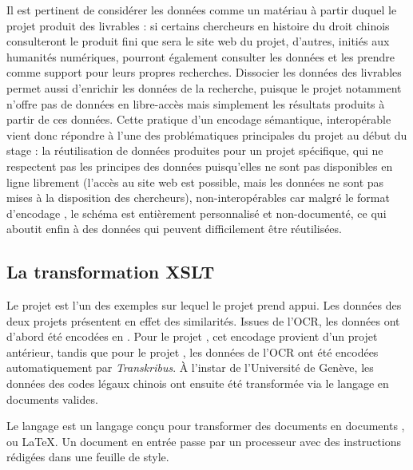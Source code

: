 Il est pertinent de considérer les données comme un matériau à partir duquel le projet produit des livrables : si certains chercheurs en histoire du droit chinois consulteront le produit fini que sera le site web du projet, d'autres, initiés aux humanités numériques, pourront également consulter les données \TEI et les prendre comme support pour leurs propres recherches. Dissocier les données des livrables permet aussi d'enrichir les données de la recherche, puisque le projet \LSC notamment n'offre pas de données en libre-accès mais simplement les résultats produits à partir de ces données. Cette pratique d'un encodage sémantique, interopérable vient donc répondre à l'une des problématiques principales du projet au début du stage : la réutilisation de données produites pour un projet spécifique, qui ne respectent pas les principes \fair des données puisqu'elles ne sont pas disponibles en ligne librement (l'accès au site web \LSC est possible, mais les données ne sont pas mises à la disposition des chercheurs), non-interopérables car malgré le format d'encodage \XML, le schéma est entièrement personnalisé et non-documenté, ce qui aboutit enfin à des données qui peuvent difficilement être réutilisées. 

\subsection{La transformation XSLT}

Le projet \cordel est l'un des exemples sur lequel le projet \COREL prend appui. Les données des deux projets présentent en effet des similarités. Issues de l'OCR, les données ont d'abord été encodées en \XML. Pour le projet \COREL, cet encodage provient d'un projet antérieur, tandis que pour le projet \cordel, les données de l'OCR ont été encodées automatiquement par \textit{Transkribus}. À l'instar de l'Université de Genève, les données des codes légaux chinois ont ensuite été transformée via le langage \XSLT en documents \TEI valides. 

Le langage \XSLT est un langage \XML conçu pour transformer des documents \XML en documents \XML, \HTML ou \LaTeX. Un document \XML en entrée passe par un processeur \XSLT avec des instructions \XSL rédigées dans une feuille de style.

